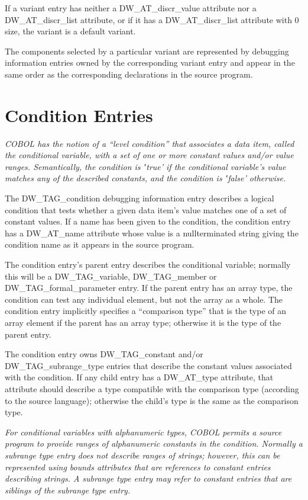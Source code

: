 If a variant entry has neither a DW\_AT\_discr\_value
attribute nor a DW\_AT\_discr\_list attribute, or if it has
a DW\_AT\_discr\_list attribute with 0 size, the variant is a
default variant.

The components selected by a particular variant are represented
by debugging information entries owned by the corresponding
variant entry and appear in the same order as the corresponding
declarations in the source program.

\section{Condition Entries}
\label{chap:conditionentries}

\textit{COBOL has the notion of a ``level condition'' that
associates a data item, called the conditional variable, with
a set of one or more constant values and/or value ranges.
Semantically, the condition is ‛true’ if the conditional
variable's value matches any of the described constants,
and the condition is ‛false’ otherwise.}

The DW\_TAG\_condition debugging information entry describes a
logical condition that tests whether a given data item’s
value matches one of a set of constant values. If a name
has been given to the condition, the condition entry has a
DW\_AT\_name attribute whose value is a null\dash terminated string
giving the condition name as it appears in the source program.

The condition entry's parent entry describes the conditional
variable; normally this will be a DW\_TAG\_variable,
DW\_TAG\_member or DW\_TAG\_formal\_parameter entry. If the parent
entry has an array type, the condition can test any individual
element, but not the array as a whole. The condition entry
implicitly specifies a “comparison type” that is the
type of an array element if the parent has an array type;
otherwise it is the type of the parent entry.

The condition entry owns DW\_TAG\_constant and/or
DW\_TAG\_subrange\_type entries that describe the constant
values associated with the condition. If any child entry has
a DW\_AT\_type attribute, that attribute should describe a type
compatible with the comparison type (according to the source
language); otherwise the child’s type is the same as the
comparison type.

\textit{For conditional variables with alphanumeric types, COBOL
permits a source program to provide ranges of alphanumeric
constants in the condition. Normally a subrange type entry
does not describe ranges of strings; however, this can be
represented using bounds attributes that are references to
constant entries describing strings. A subrange type entry may
refer to constant entries that are siblings of the subrange
type entry.}


